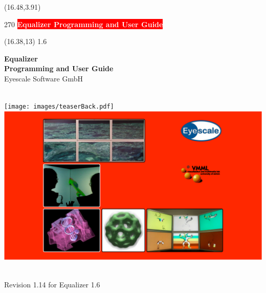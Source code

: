 \documentclass[10pt]{scrartcl}
\newcommand{\boxwidth}{5in}
\newcommand{\spacewidth}{621pt}
\newcommand{\spinewidth}{20.27808pt} %
\begin{document}
\thispagestyle{empty}

\begin{textblock}{}(16.48,3.91)
  \begin{rotate}{270}
    \setlength{\fboxsep}{31.7pt}
    \colorbox{red}{\textsf{\bfseries\large\textcolor{white}{{\hspace{38pt}Equalizer
            Programming and User Guide\hspace{38pt}}}}}
  \end{rotate}
\end{textblock}

\begin{textblock}{}(16.38,13)
  {1.6}
\end{textblock}

\parbox[t]{\spacewidth}{\hfill}
\parbox[t]{\boxwidth}{
\vspace{-32pt}
  \center
  \textsf{\textbf{\huge Equalizer\\Programming and User Guide}}\\[\bigskipamount]
  {\Large Eyescale Software GmbH}\\
}\\
\vfill
\vspace{32pt}
\hspace{-128pt}
  \texttt{[image: images/teaserBack.pdf]}
  \hspace{\spinewidth}
  \includegraphics[width=\spacewidth]{images/teaser.pdf}
\\
\vfill
\parbox[t]{\spacewidth}{\hfill}
\parbox[t]{\boxwidth}{ \\\vspace{1cm}
  {\Large Revision 1.14 for Equalizer 1.6}\\[\medskipamount]
}
\end{document}
